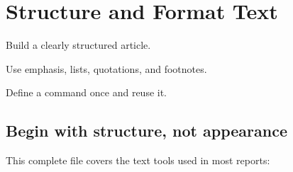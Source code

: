 \chapter{Structure and Format Text}
\label{chap:text}

\begin{learningoutcomes}
  \item Build a clearly structured article.
  \item Use emphasis, lists, quotations, and footnotes.
  \item Define a command once and reuse it.
\end{learningoutcomes}

\section{Begin with structure, not appearance}

This complete file covers the text tools used in most reports:

